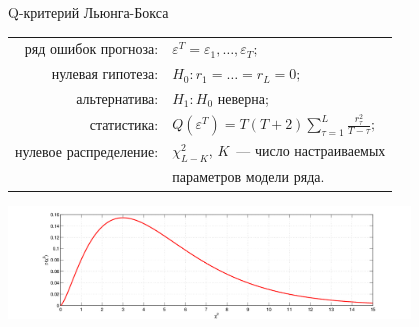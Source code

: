 \documentclass[9pt,pdf,utf8,hyperref={unicode},aspectratio=169]{beamer}
\begin{document}
    
\begin{frame}{Q-критерий Льюнга-Бокса}
	\begin{center}
		\begin{tabular}{rl}
			ряд ошибок прогноза:            & $\varepsilon^T = \varepsilon_1,\dots,\varepsilon_T;$ \\
			нулевая гипотеза:               & $H_0\colon r_1 = \dots = r_L=0;$ \\
			альтернатива:                   & $H_1\colon H_0$ неверна;\\
			статистика:                     & $Q\left(\varepsilon^T\right) = T\left(T+2\right) \sum\limits_{\tau=1}^L \frac{r_{\tau}^2}{T-\tau};$ \\
			нулевое распределение:          & $\chi^2_{L-K}$, $K$~--- число настраиваемых\\
			& параметров модели ряда.
		\end{tabular}
		\includegraphics[width=0.8\textwidth]{chi2.png}
	\end{center}
\end{frame}
    
\end{document}
